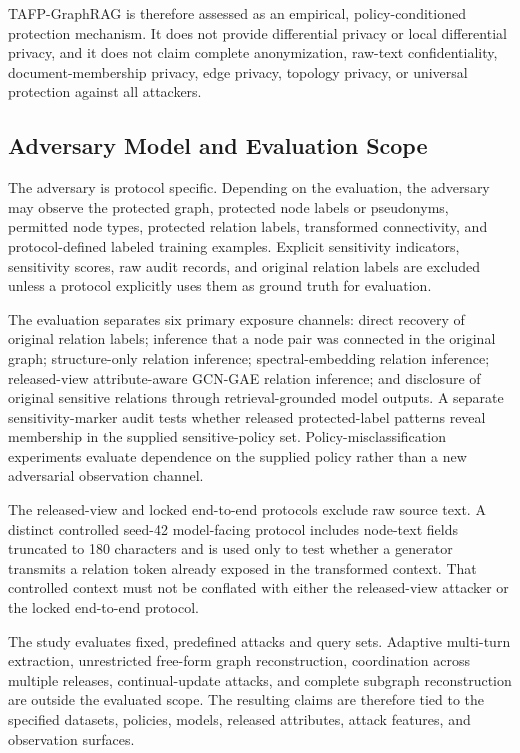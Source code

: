 \documentclass[preprint,12pt]{elsarticle}
\begin{document}
TAFP-GraphRAG is therefore assessed as an empirical, policy-conditioned protection mechanism. It does not provide differential privacy or local differential privacy, and it does not claim complete anonymization, raw-text confidentiality, document-membership privacy, edge privacy, topology privacy, or universal protection against all attackers.

\subsection{Adversary Model and Evaluation Scope}

The adversary is protocol specific. Depending on the evaluation, the adversary may observe the protected graph, protected node labels or pseudonyms, permitted node types, protected relation labels, transformed connectivity, and protocol-defined labeled training examples. Explicit sensitivity indicators, sensitivity scores, raw audit records, and original relation labels are excluded unless a protocol explicitly uses them as ground truth for evaluation.

The evaluation separates six primary exposure channels: direct recovery of original relation labels; inference that a node pair was connected in the original graph; structure-only relation inference; spectral-embedding relation inference; released-view attribute-aware GCN-GAE relation inference; and disclosure of original sensitive relations through retrieval-grounded model outputs. A separate sensitivity-marker audit tests whether released protected-label patterns reveal membership in the supplied sensitive-policy set. Policy-misclassification experiments evaluate dependence on the supplied policy rather than a new adversarial observation channel.

The released-view and locked end-to-end protocols exclude raw source text. A distinct controlled seed-42 model-facing protocol includes node-text fields truncated to 180 characters and is used only to test whether a generator transmits a relation token already exposed in the transformed context. That controlled context must not be conflated with either the released-view attacker or the locked end-to-end protocol.

The study evaluates fixed, predefined attacks and query sets. Adaptive multi-turn extraction, unrestricted free-form graph reconstruction, coordination across multiple releases, continual-update attacks, and complete subgraph reconstruction are outside the evaluated scope. The resulting claims are therefore tied to the specified datasets, policies, models, released attributes, attack features, and observation surfaces.
\end{document}
